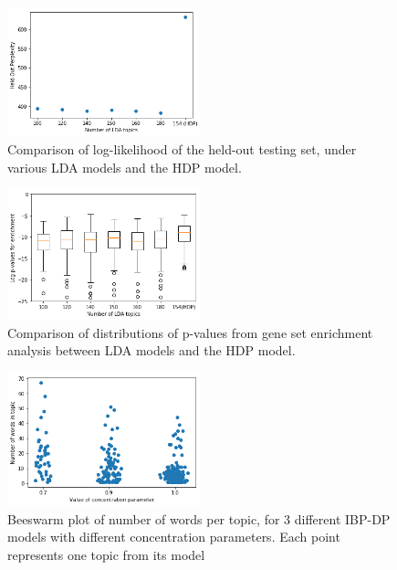 \documentclass[11pt]{article}
\begin{document}
\begin{figure}
    \centering
    \includegraphics[width=0.5\textwidth]{hdp-perplexity}
    \caption{Comparison of log-likelihood of the held-out testing set, under various LDA models and the HDP model.}
    \label{fig:hdp-perplexity}
\end{figure}

\begin{figure}
    \centering
    \includegraphics[width=0.5\textwidth]{hdp-enrichment}
    \caption{Comparison of distributions of p-values from gene set enrichment analysis between LDA models and the HDP model.}
    \label{fig:hdp-enrichment}
\end{figure}

\begin{figure}
    \centering
    \includegraphics[width=0.5\textwidth]{ibp_words_in_topic}
    \caption{Beeswarm plot of number of words per topic, for 3 different IBP-DP models with different concentration parameters. Each point represents one topic from its model}
    \label{fig:ibp_words_in_topic}
\end{figure}
\end{document}

